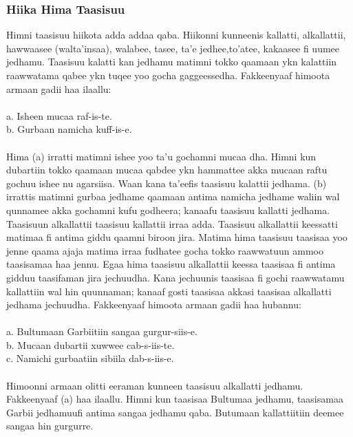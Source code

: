 \documentclass[11pt,b5paper]{book}
\begin{document}
\subsubsection{Hiika Hima Taasisuu}

Himni taasisuu hiikota adda addaa qaba. Hiikonni kunneenis kallatti, alkallattii, hawwaasee (walta’insaa), walabee, tasee, ta’e jedhee,to’atee, kakaasee fi uumee jedhamu. Taasisuu
kalatti kan jedhamu matimni tokko qaamaan ykn kalattiin raawwatama qabee ykn tuqee yoo gocha gaggeessedha. Fakkeenyaaf himoota armaan gadii haa ilaallu: \\
\\
a. Isheen mucaa raf-is-te.\\
b. Gurbaan namicha kuff-is-e.\\
\\
Hima (a) irratti matimni ishee yoo ta’u gochamni mucaa dha. Himni kun dubartiin tokko qaamaan mucaa qabdee ykn hammattee akka mucaan raftu gochuu ishee nu agarsiisa. Waan kana ta’eefis taasisuu kalattii jedhama. (b) irrattis matimni gurbaa jedhame qaamaan antima namicha jedhame waliin wal qunnamee akka gochamni kufu godheera; kanaafu taasisuu kallatti jedhama. Taasisuun alkallattii taasisuu kallattii irraa adda. Taasisuu alkallattii keessatti matimaa fi antima giddu qaamni biroon jira. Matima hima taasisuu taasisaa yoo jenne qaama ajaja matima irraa fudhatee gocha tokko raawwatuun ammoo taasisamaa haa jennu. Egaa hima taasisuu alkallattii keessa taasisaa fi antima gidduu taasifaman jira jechuudha.
Kana jechuunis taasisaa fi gochi raawwatamu kallattiin wal hin quunnaman; kanaaf gosti taasisaa akkasi taasisaa alkallatti jedhama jechuudha. Fakkeenyaaf himoota armaan gadii haa hubannu: \\
\\
a. Bultumaan Garbiitiin sangaa gurgur-siis-e.\\
b. Mucaan dubartii xuwwee cab-s-iis-te.\\
c. Namichi gurbaatiin sibiila dab-s-iis-e.\\
\\
Himoonni armaan olitti eeraman kunneen taasisuu alkallatti jedhamu. Fakkeenyaaf (a) haa ilaallu. Himni kun taasisaa Bultumaa jedhamu, taasisamaa Garbii jedhamuufi antima sangaa jedhamu qaba. Butumaan kallattiitiin deemee sangaa hin gurgurre. 
\end{document}
